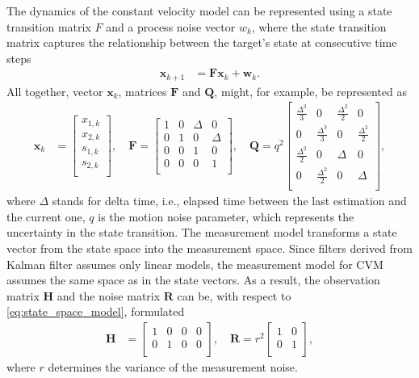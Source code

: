 The dynamics of the constant velocity model can be represented using a state transition matrix $F$  and a process
noise vector $w_k$, where the state transition matrix captures the relationship between the target's state at
consecutive time steps
\begin{align}
    \mathbf{x}_{k+1} &= \mathbf{F x}_k + \mathbf{w}_k.
\end{align}
All together, vector $\mathbf{x}_k$, matrices $\mathbf{F}$ and $\mathbf{Q}$, might, for example, be represented as
\begin{align}
    \mathbf{x}_k &=
        \begin{bmatrix}
            x_{1,k} \\
            x_{2,k} \\
            s_{1,k} \\
            s_{2,k} \\
        \end{bmatrix},
    \quad \mathbf{F} =
        \begin{bmatrix}
            1 & 0 & \Delta & 0 \\
            0 & 1 & 0 & \Delta \\
            0 & 0 & 1 & 0 \\
            0 & 0 & 0 & 1 \\
        \end{bmatrix},
    \quad \mathbf{Q} = q^2
        \begin{bmatrix}
            \frac{\Delta^3}{3} & 0 & \frac{\Delta^2}{2} & 0 \\
            0 & \frac{\Delta^3}{3} & 0 & \frac{\Delta^2}{2} \\
            \frac{\Delta^2}{2} & 0 & \Delta & 0 \\
            0 & \frac{\Delta^2}{2} & 0 & \Delta \\
        \end{bmatrix},
    \label{eq:state_space_model}
\end{align}
where $\Delta$ stands for delta time, i.e., elapsed time between the last estimation and the current one, $q$ is the
motion noise parameter, which represents the uncertainty in the state transition. The measurement model transforms a
state vector from the state space into the measurement space. Since filters derived from Kalman filter assumes only
linear models, the measurement model for CVM assumes the same space as in the state vectors. As a result, the
observation matrix $\mathbf{H}$ and the noise matrix $\mathbf{R}$ can be, with respect to \eqref{eq:state_space_model}, formulated
\begin{align}
    \mathbf{H} &=
    \begin{bmatrix}
        1 & 0 & 0 & 0 \\
        0 & 1 & 0 & 0 \\
    \end{bmatrix},
    \quad \mathbf{R} = r^2
    \begin{bmatrix}
        1 & 0  \\
        0 & 1  \\
    \end{bmatrix},
\end{align}
where $r$ determines the variance of the measurement noise.

